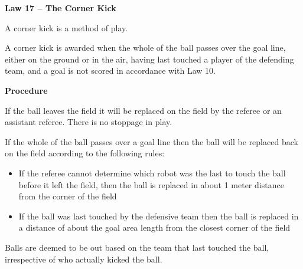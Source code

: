 \clearpage
\sffamily
{\bfseries\color[rgb]{0.4,0.4,0.4}
Law 17 -- The Corner Kick}
{}


\bigskip

A corner kick is a method of   play.

\bigskip

A corner kick is awarded when the whole of the ball passes over the goal
line, either on the ground or in the air, having last touched a player
of the defending team, and a goal is not scored in accordance with Law
10.


\bigskip

{\bfseries Procedure}

\headlinebox

If the ball leaves the field it will be replaced on the field by the
referee or an assistant referee. There is no stoppage in play. 

If the whole of the ball passes over a goal line then the ball will be
replaced back on the field according to the following rules: 

\begin{itemize}
\item If the referee cannot determine which robot was the last to touch
the ball before it left the field, then the ball is replaced in about 1
meter distance from the corner of the field
\item If the ball was last touched by the defensive team then the ball
is replaced in a distance of about the goal area length from the
closest corner of the field
\end{itemize}

Balls are deemed to be out based on the team that last touched the ball,
irrespective of who actually kicked the ball. 

\bigskip


